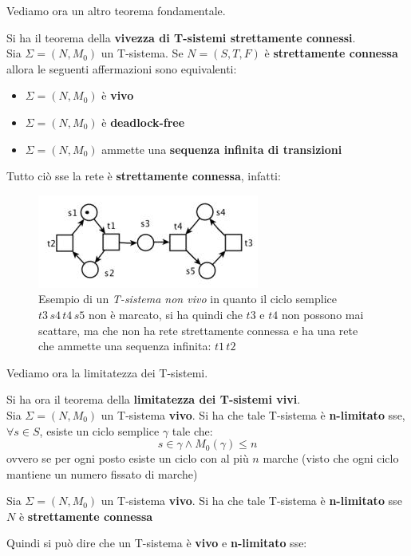 \documentclass[a4paper,12pt, oneside]{book}
\begin{document}
Vediamo ora un altro teorema fondamentale.
\begin{teorema}
  Si ha il teorema della \textbf{vivezza di T-sistemi strettamente connessi}.\\
  Sia $\Sigma =(N,M_0)$ un T-sistema. Se $N=(S,T,F)$ è \textbf{strettamente
    connessa} allora le seguenti affermazioni sono equivalenti:
  \begin{itemize}
    \item $\Sigma =(N,M_0)$ è \textbf{vivo}
    \item $\Sigma =(N,M_0)$ è \textbf{deadlock-free}
    \item $\Sigma =(N,M_0)$ ammette una \textbf{sequenza infinita di
      transizioni} 
  \end{itemize}
  Tutto ciò sse la rete è \textbf{strettamente connessa}, infatti:
  \begin{figure}[H]
    \centering
    \includegraphics[scale = 0.6]{img/tsi4.jpg}
    \caption{Esempio di un \emph{T-sistema non vivo} in quanto il ciclo semplice
      $t3\,s4\,t4\,s5$ non è marcato, si ha quindi che $t3$ e $t4$ non
      possono mai scattare, ma che non ha rete strettamente connessa e ha una
      rete che ammette una sequenza infinita: $t1\,t2$}
  \end{figure}
\end{teorema}
Vediamo ora la limitatezza dei T-sistemi.
\begin{teorema}
  Si ha ora il teorema della \textbf{limitatezza dei T-sistemi vivi}.\\
   Sia $\Sigma =(N,M_0)$ un T-sistema \textbf{vivo}. Si ha che tale T-sistema è
   \textbf{n-limitato} sse, $\forall s\in S$, esiste un ciclo semplice $\gamma$
   tale che:
   \[s\in \gamma\land M_0(\gamma)\leq n\]
   ovvero se per ogni posto esiste un ciclo con al più $n$ marche (visto che
   ogni ciclo mantiene un numero fissato di marche)
\end{teorema}
\begin{corollario}
   Sia $\Sigma =(N,M_0)$ un T-sistema \textbf{vivo}. Si ha che tale T-sistema è
   \textbf{n-limitato} sse $N$ è \textbf{strettamente connessa}
\end{corollario}
Quindi si può dire che un T-sistema è \textbf{vivo} e \textbf{n-limitato} sse:
\end{document}
